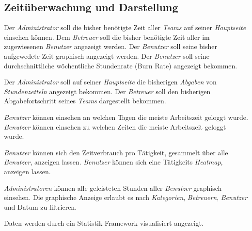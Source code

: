 \subsection{Zeitüberwachung und Darstellung}
    \begin{requirements}
        \begin{requirements}
             Der \emph{Administrator} soll die bisher benötigte Zeit aller \emph{Teams} auf seiner \emph{Hauptseite} einsehen können.
             Dem \emph{Betreuer} soll die bisher benötigte Zeit aller im zugewiesenen \emph{Benutzer} angezeigt werden.
             Der \emph{Benutzer} soll seine bisher aufgewedete Zeit graphisch angezeigt werden.
             Der \emph{Benutzer} soll seine durchschnittliche wöchentliche Stundenrate (Burn Rate) angezeigt bekommen.
        \end{requirements}

        \begin{requirements}
             Der \emph{Administrator} soll auf seiner \emph{Hauptseite} die bisherigen \emph{Abgaben} von \emph{Stundenzetteln} angezeigt bekommen.
             Der \emph{Betreuer} soll den bisherigen Abgabefortschritt seines \emph{Teams} dargestellt bekommen.
        \end{requirements}

        \begin{requirements}
             \emph{Benutzer} können einsehen an welchen Tagen die meiste Arbeitszeit geloggt wurde.
             \emph{Benutzer} können einsehen zu welchen Zeiten die meiste Arbeitszeit geloggt wurde.
        \end{requirements}

        \begin{requirements}
             \emph{Benutzer} können sich den Zeitverbrauch pro Tätigkeit, gesammelt über alle \emph{Benutzer}, anzeigen lassen.
             \emph{Benutzer} können sich eine Tätigkeits \emph{Heatmap}, anzeigen lassen.
        \end{requirements}
        
        \begin{requirements}
              \emph{Administratoren} können alle geleisteten Stunden aller \emph{Benutzer} graphisch einsehen.
              Die graphische Anzeige erlaubt es nach \emph{Kategorien}, \emph{Betreuern}, \emph{Benutzer} und Datum zu filtrieren.
        \end{requirements}

        Daten werden durch ein Statistik Framework visualisiert angezeigt.
    \end{requirements}

